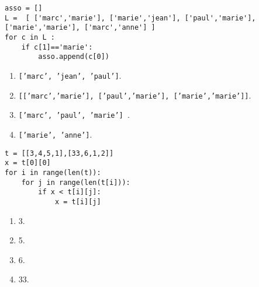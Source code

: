 \begin{lstlisting}
asso = []
L =  [ ['marc','marie'], ['marie','jean'], ['paul','marie'], ['marie','marie'], ['marc','anne'] ]
for c in L :
    if c[1]=='marie':
        asso.append(c[0])
\end{lstlisting}
\begin{enumerate}
\item \texttt{['marc', 'jean', 'paul']}.
\item \texttt{[['marc','marie'], ['paul','marie'], ['marie','marie']]}.
\item \texttt{['marc', 'paul', 'marie'] }.%
\item \texttt{['marie', 'anne']}.
\end{enumerate}

\begin{lstlisting}
t = [[3,4,5,1],[33,6,1,2]]
x = t[0][0]
for i in range(len(t)):
    for j in range(len(t[i])):
        if x < t[i][j]:
            x = t[i][j]
\end{lstlisting}
\begin{enumerate}
\item 3.
\item 5.
\item 6.
\item 33. %
\end{enumerate}
